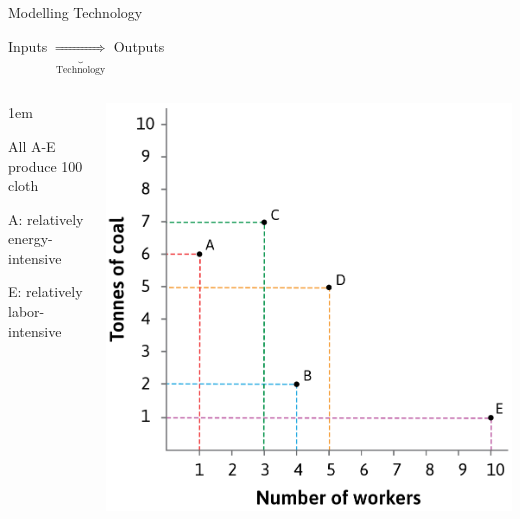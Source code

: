 \documentclass[11pt,aspectratio=43,usenames,dvipsnames]{beamer}
\let\olditemize=\itemize
\let\endolditemize=\enditemize
\renewenvironment{itemize}{\olditemize \itemsep1em}{\endolditemize}
\theoremstyle{definition}
\begin{document}
\begin{frame}{Modelling Technology}
\label{slide:Modelling_Technology}
    \begin{center}
        Inputs $ \underbrace{\Longrightarrow}_{\text{Technology}} $ Outputs
    \end{center}
    \begin{columns}
        \begin{column}{0.4\textwidth}
            \begin{itemize}
                \item All A-E produce 100 cloth
                \item A: relatively energy-intensive
                \item E: relatively labor-intensive
            \end{itemize}
        \end{column}
        \begin{column}{0.6\textwidth}
            \includegraphics[width=\textwidth]{./figures/Figure2_3.png}
        \end{column}
    \end{columns}

\end{frame}
\end{document}
